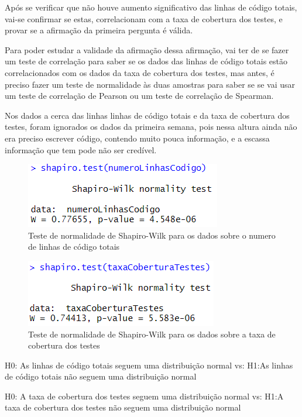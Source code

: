 Após se verificar que não houve aumento significativo das linhas de código totais, vai-se confirmar se estas, correlacionam com a taxa de cobertura dos testes, e provar se a afirmação da primeira pergunta é válida.

Para poder estudar a validade da afirmação dessa afirmação, vai ter de se fazer um teste de correlação para saber se os dados das linhas de código totais estão correlacionados com os dados da taxa de cobertura dos testes, mas antes, é preciso fazer um teste de normalidade às duas amostras para saber se se vai usar um teste de correlação de Pearson ou um teste de correlação de Spearman.

Nos dados a cerca das linhas linhas de código totais e da taxa de cobertura dos testes, foram ignorados os dados da primeira semana, pois nessa altura ainda não era preciso escrever código, contendo muito pouca informação, e a escassa informação que tem pode não ser credível.


\begin{figure}
    \centering
    \includegraphics[width=0.5\linewidth]{imagens//questao2/shapiroTestLinhasDeCodigoParaCorrelacao.png}
    \caption{Teste de normalidade de Shapiro-Wilk para os dados sobre o numero de linhas de código totais}
    \label{fig:ShairoTestLinhasParaCorrelacao}
\end{figure}
\begin{figure}
    \centering
    \includegraphics[width=0.5\linewidth]{imagens//questao2/ShapiroTestTaxaCoberturaParaCorrelacao.png}
    \caption{Teste de normalidade de Shapiro-Wilk para os dados sobre a taxa de cobertura dos testes}
    \label{fig:ShairoTestTaxaCoverturaParaCorrelacao}
\end{figure}

\begin{center}
    H0: As linhas de código totais seguem uma distribuição normal
    \newline
    vs:
    \newline
    H1:As linhas de código totais não seguem uma distribuição normal
    \newline
\end{center}
\newline
\begin{center}
    H0: A taxa de cobertura dos testes seguem uma distribuição normal
    \newline
    vs:
    \newline
    H1:A taxa de cobertura dos testes não seguem uma distribuição normal
    \newline
\end{center}

